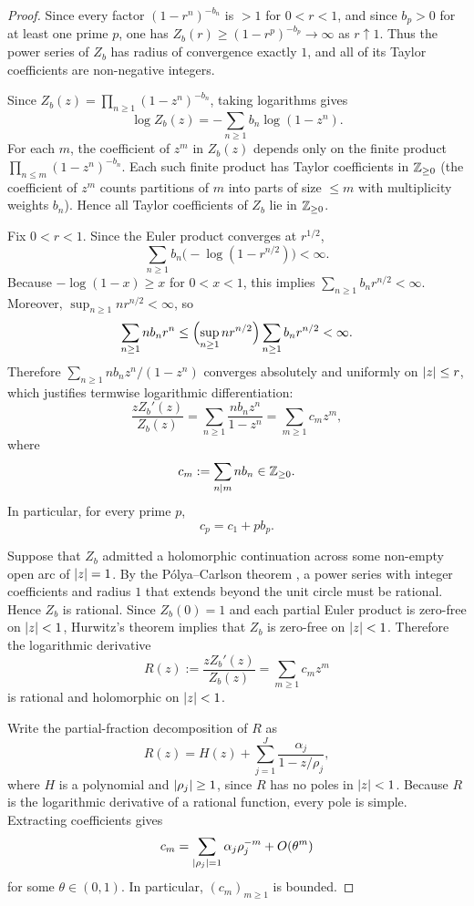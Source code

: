 \begin{proof}
  Since every factor \((1-r^n)^{-b_n}\) is \(>1\) for \(0<r<1\), and
  since \(b_p>0\) for at least one prime \(p\), one has
  \(Z_b(r)\ge(1-r^p)^{-b_p}\to\infty\) as \(r\uparrow 1\). Thus the
  power series of \(Z_b\) has radius of convergence exactly \(1\), and
  all of its Taylor coefficients are non-negative integers.

  Since \(Z_b(z)=\prod_{n\ge 1}(1-z^n)^{-b_n}\), taking logarithms
  gives
  \[
    \log Z_b(z)=-\sum_{n\ge 1}b_n\log(1-z^n).
  \]
  For each \(m\), the coefficient of \(z^m\) in \(Z_b(z)\) depends only
  on the finite product \(\prod_{n\le m}(1-z^n)^{-b_n}\). Each such
  finite product has Taylor coefficients in \(\mathbb{Z}_{\ge 0}\) (the
  coefficient of \(z^m\) counts partitions of \(m\) into parts of size
  \(\le m\) with multiplicity weights \(b_n\)). Hence all Taylor
  coefficients of \(Z_b\) lie in \(\mathbb{Z}_{\ge 0}\).

  Fix \(0<r<1\). Since the Euler product converges at \(r^{1/2}\),
  \[
    \sum_{n\ge 1}b_n\bigl(-\log(1-r^{n/2})\bigr)<\infty.
  \]
  Because \(-\log(1-x)\ge x\) for \(0<x<1\), this implies
  \(\sum_{n\ge 1}b_n r^{n/2}<\infty\). Moreover,
  \(\sup_{n\ge 1}nr^{n/2}<\infty\), so
  \[
    \sum_{n\ge 1}nb_n r^n
    \le\Bigl(\sup_{n\ge 1}nr^{n/2}\Bigr)\sum_{n\ge 1}b_n r^{n/2}
    <\infty.
  \]
  Therefore \(\sum_{n\ge 1}nb_nz^n/(1-z^n)\) converges absolutely and
  uniformly on \(\lvert z \rvert\le r\), which justifies termwise logarithmic
  differentiation:
  \[
    \frac{zZ_b'(z)}{Z_b(z)}
    =\sum_{n\ge 1}\frac{n b_n z^n}{1-z^n}
    =\sum_{m\ge 1} c_m z^m,
  \]
  where
  \[
    c_m:=\sum_{n\mid m} n b_n\in\mathbb{Z}_{\ge 0}.
  \]
  In particular, for every prime \(p\),
  \[
    c_p=c_1+p b_p.
  \]

  Suppose that \(Z_b\) admitted a holomorphic continuation across some
  non-empty open arc of \(\lvert z \rvert=1\). By the P\'olya--Carlson theorem
  \cite{Polya1923,Carlson1921}, a power series with integer
  coefficients and radius \(1\) that extends beyond the unit circle
  must be rational. Hence \(Z_b\) is rational. Since \(Z_b(0)=1\) and
  each partial Euler product is zero-free on \(\lvert z \rvert<1\), Hurwitz's
  theorem implies that \(Z_b\) is zero-free on \(\lvert z \rvert<1\). Therefore
  the logarithmic derivative
  \[
    R(z):=\frac{zZ_b'(z)}{Z_b(z)}=\sum_{m\ge 1} c_m z^m
  \]
  is rational and holomorphic on \(\lvert z \rvert<1\).

  Write the partial-fraction decomposition of \(R\) as
  \[
    R(z)=H(z)+\sum_{j=1}^J\frac{\alpha_j}{1-z/\rho_j},
  \]
  where \(H\) is a polynomial and \(\lvert \rho_j \rvert\ge 1\), since \(R\)
  has no poles in \(\lvert z \rvert<1\). Because \(R\) is the logarithmic
  derivative of a rational function, every pole is simple. Extracting
  coefficients gives
  \[
    c_m
    =\sum_{\lvert \rho_j \rvert=1}\alpha_j\rho_j^{-m}+O(\theta^m)
  \]
  for some \(\theta\in(0,1)\). In particular, \((c_m)_{m\ge 1}\) is
  bounded.


\end{proof}
